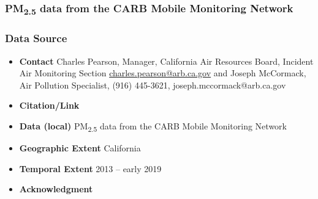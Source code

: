 \clearpage
\subsubsection{\texorpdfstring{PM\textsubscript{2.5}}{} data from the CARB Mobile Monitoring Network}



\subsubsection*{Data Source}

\begin{itemize}[nolistsep]
\item \textbf{Contact} Charles Pearson, Manager, California Air Resources Board, Incident Air Monitoring Section \url{charles.pearson@arb.ca.gov} and Joseph McCormack, Air Pollution Specialist, (916) 445-3621, joseph.mccormack@arb.ca.gov
\item \textbf{Citation/Link} %
\item \textbf{Data (local)} PM\textsubscript{2.5} data from the CARB Mobile Monitoring Network
\item \textbf{Geographic Extent} California
\item \textbf{Temporal Extent} 2013 -- early 2019
\item \textbf{Acknowledgment}
\end{itemize}

